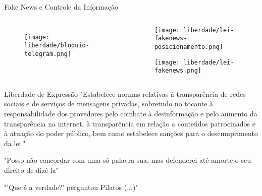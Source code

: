 \begin{frame}[t]{Fake News e Controle da Informação} 
    \begin{columns}[t]
        \begin{figure}
            \texttt{[image: liberdade/bloquio-telegram.png]}
            \caption{\cite{bloqueiotelegram:online}}
        \end{figure}
        
        \begin{center}
            \begin{figure}
                \texttt{[image: liberdade/lei-fakenews-posicionamento.png]}
                \caption{\cite{plataformasfakenews:online}}

                \texttt{[image: liberdade/lei-fakenews.png]}
                \caption{\cite{bbcfakenews:online}}
            \end{figure}
        \end{center}
    \end{columns}
\end{frame}

\begin{frame}[t]{Liberdade de Expressão} 
    "Estabelece normas relativas à transparência de redes sociais e de serviços de mensagens privadas, sobretudo no tocante à responsabilidade dos provedores pelo combate à desinformação e pelo aumento da transparência na internet, à transparência em relação a conteúdos patrocinados e à atuação do poder público, bem como estabelece sanções para o descumprimento da lei." \cite{fakenews-pl2630-2020}
    
    \vspace{0.25cm}
    "Posso não concordar com uma só palavra sua, mas defenderei até amorte  o  seu  direito  de  dizê-la" \cite{ribeiro2021ameacca}

    \vspace{0.25cm}
    "'Que é a verdade?' perguntou Pilatos (...)"
\end{frame}